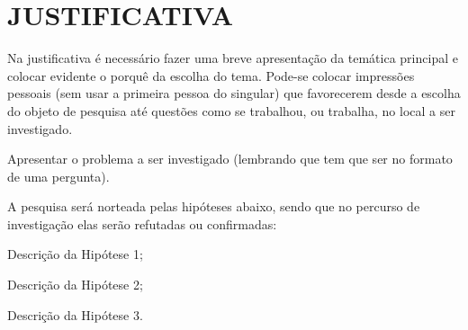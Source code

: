 \chapter{JUSTIFICATIVA}
Na justificativa é necessário fazer uma breve apresentação da temática principal e colocar evidente o porquê da escolha do tema. Pode-se colocar impressões pessoais (sem usar a primeira pessoa do singular) que favorecerem desde a escolha do objeto de pesquisa até questões como se trabalhou, ou trabalha, no local a ser investigado.

Apresentar o problema a ser investigado (lembrando que tem que ser no formato de uma pergunta).

A pesquisa será norteada pelas hipóteses abaixo, sendo que no percurso de investigação elas serão refutadas ou confirmadas:
\begin{uemaenum}
    \item Descrição da Hipótese 1;
    \item Descrição da Hipótese 2;
    \item Descrição da Hipótese 3.
\end{uemaenum}

